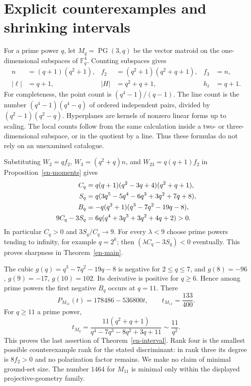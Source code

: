 \documentclass[12pt]{amsart}
\theoremstyle{definition}
\theoremstyle{remark}
\numberwithin{equation}{section}
\begin{document}
\section{Explicit counterexamples and shrinking intervals}
For a prime power $q$, let $M_q=\operatorname{PG}(3,q)$ be the vector matroid on the one-dimensional subspaces of $\mathbb F_q^4$. Counting subspaces gives
\begin{align*}
 n&=(q+1)(q^2+1),& f_2&=(q^2+1)(q^2+q+1),& f_3&=n,\\
 |\ell|&=q+1,& |H|&=q^2+q+1,& h_\ell&=q+1.
\end{align*}
For completeness, the point count is $(q^4-1)/(q-1)$. The line count is the number $(q^4-1)(q^4-q)$ of ordered independent pairs, divided by $(q^2-1)(q^2-q)$. Hyperplanes are kernels of nonzero linear forms up to scaling. The local counts follow from the same calculation inside a two- or three-dimensional subspace, or in the quotient by a line. Thus these formulas do not rely on an unexamined catalogue.

Substituting $W_2=qf_2$, $W_3=(q^2+q)n$, and $W_{23}=q(q+1)f_2$ in Proposition~\ref{en-moments} gives
\begin{align}\label{en-pg}
 C_q&=q(q+1)(q^2-3q+4)(q^2+q+1),\notag\\
 S_q&=q(3q^5-5q^4-6q^3+3q^2+7q+8),\\
 B_q&=-q(q^2+1)(q^3-7q^2-19q-8),\notag\\
 9C_q-3S_q&=6q(q^4+3q^3+3q^2+4q+2)>0.\notag
\end{align}
In particular $C_q>0$ and $3S_q/C_q\to9$. For every $\lambda<9$ choose prime powers tending to infinity, for example $q=2^k$; then $(\lambda C_q-3S_q)<0$ eventually. This proves sharpness in Theorem~\ref{en-main}.

The cubic $g(q)=q^3-7q^2-19q-8$ is negative for $2\leq q\leq7$, and $g(8)=-96$, $g(9)=-17$, $g(10)=102$. Its derivative is positive for $q\geq6$. Hence among prime powers the first negative $B_q$ occurs at $q=11$. There
\[
 P_{M_{11}}(t)=178486-536800t,\qquad t_{M_{11}}=\frac{133}{400}.
\]
For $q\geq11$ a prime power,
\begin{equation}\label{en-tq}
 t_{M_q}=\frac{11(q^2+q+1)}{q^4-7q^3-8q^2+3q+11}
             \sim\frac{11}{q^2}.
\end{equation}
This proves the last assertion of Theorem~\ref{en-interval}. Rank four is the smallest possible counterexample rank for the stated discriminant: in rank three its degree is $8f_2>0$ and no polarization factor remains. We make no claim of minimal ground-set size. The number $1464$ for $M_{11}$ is minimal only within the displayed projective-geometry family.
\end{document}
